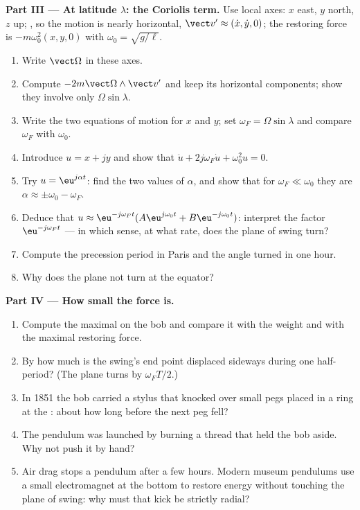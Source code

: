 \begin{problem}
\medskip
\noindent\textbf{Part III --- At latitude $\lambda$: the Coriolis term.}
Use local axes: $x$ east, $y$ north, $z$ up; , so the
motion is nearly horizontal, $\vect v' \approx (\dot x, \dot y, 0)$; the
restoring force is $-m\omega_0^2(x, y, 0)$ with $\omega_0 = \sqrt{g/\ell}$.
\begin{enumerate}[resume]
  \item Write $\vect\Omega$ in these axes.
  \item Compute $-2m\vect\Omega\wedge\vect v'$ and keep its horizontal
        components; show they involve only $\Omega\sin\lambda$.
  \item Write the two equations of motion for $x$ and $y$; set
        $\omega_F = \Omega\sin\lambda$ and compare $\omega_F$ with $\omega_0$.
  \item Introduce $u = x + jy$ and show that $\ddot u + 2j\omega_F\dot u +
        \omega_0^2u = 0$.
  \item Try $u = \eu^{j\alpha t}$: find the two values of $\alpha$, and
        show that for $\omega_F \ll \omega_0$ they are $\alpha \approx \pm\omega_0
        - \omega_F$.
  \item Deduce that $u \approx \eu^{-j\omega_Ft}(A\eu^{j\omega_0t} + B\eu^{-j\omega_0t})$:
        interpret the factor $\eu^{-j\omega_Ft}$ --- in which sense, at what
        rate, does the plane of swing turn?
  \item Compute the precession period in Paris and the angle turned in
        one hour.
  \item Why does the plane not turn at the equator?
\end{enumerate}

\medskip
\noindent\textbf{Part IV --- How small the force is.}
\begin{enumerate}[resume]
  \item Compute the maximal  on the bob and compare it
        with the weight and with the maximal restoring force.
  \item By how much is the swing's end point displaced sideways during
        one half-period? (The plane turns by $\omega_FT/2$.)
  \item In 1851 the bob carried a stylus that knocked over small pegs
        placed in a ring at the : about how long before the
        next peg fell?
  \item The pendulum was launched by burning a thread that held the bob
        aside. Why not push it by hand?
  \item Air drag stops a pendulum after a few hours. Modern museum
        pendulums use a small electromagnet at the bottom to restore
        energy without touching the plane of swing: why must that kick be
        strictly radial?
\end{enumerate}


\end{problem}
